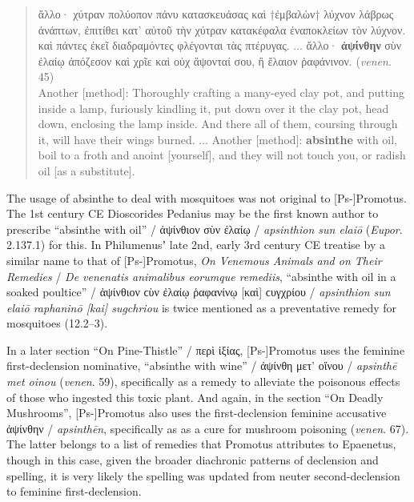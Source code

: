 \vspace*{3mm} 
 \begin{quote}ἄλλο· χύτραν πολύοπον πάνυ κατασκευάσας καὶ †ἐμβαλὼν† λύχνον λάβρως ἀνάπτων, %
ἐπιτίθει κατ’ αὐτοῦ τὴν χύτραν κατακέφαλα ἐναποκλείων τὸν λύχνον. %
καὶ πάντες ἐκεῖ διαδραμόντες φλέγονται τὰς πτέρυγας. ... %
ἄλλο· \textbf{ἀψίνθην} σὺν ἐλαίῳ ἀπόζεσον καὶ χρῖε καὶ οὐχ ἅψονταί σου, ἢ ἔλαιον ῥαφάνινον. (\textit{venen}. 45) \\[1mm] %
Another [method]: Thoroughly crafting a many-eyed clay pot, %
and putting inside a lamp, furiously kindling it, %
put down over it the clay pot, head down, enclosing the lamp inside. %
And there all of them, coursing through it, will have their wings burned. ... %
 Another [method]: \textbf{absinthe} with oil, boil to a froth and anoint [yourself], %
 and they will not touch you, or radish oil [as a substitute].\end{quote} %
 \vspace*{3mm}

The usage of absinthe to deal with mosquitoes was not original to [Ps-]Promotus. %
The 1st century CE Dioscorides Pedanius may be the first known author to prescribe “absinthe with oil” / %
ἀψίνθιον σὺν ἐλαίῳ / \textit{apsinthion sun elaiō} (\textit{Eupor}. 2.137.1) for this. %
In Philumenusʼ late 2nd, early 3rd century CE treatise by a similar name to that of [Ps-]Promotus, %
\textit{On Venemous Animals and on Their Remedies} / \textit{De venenatis animalibus eorumque remediis}, %
“absinthe with oil in a soaked poultice” / ἀψίνθιον ϲὺν ἐλαίῳ ῥαφανίνῳ [καὶ] ϲυγχρίου / %
\textit{apsinthion sun elaiō raphaninō [kai] sugchriou} is twice mentioned as a preventative remedy for mosquitoes (12.2--3). 

In a later section “On Pine-Thistle” / περὶ ἰξίας, %
[Ps-]Promotus uses the feminine first-declension nominative, “absinthe with wine” / ἀψίνθη μετ’ οἴνου / \textit{apsinthē met oinou} (\textit{venen}. 59), %
specifically as a remedy to alleviate the poisonous effects of those who ingested this toxic plant. %
And again, in the section “On Deadly Mushrooms”, %
[Ps-]Promotus also uses the first-declension feminine accusative ἀψίνθην / \textit{apsinthēn}, %
specifically as as a cure for mushroom poisoning (\textit{venen}. 67). %
The latter belongs to a list of remedies that Promotus attributes %
to Epaenetus, though in this case, given the broader diachronic patterns of declension and spelling, %
it is very likely the spelling was updated from neuter second-declension to feminine first-declension. %

